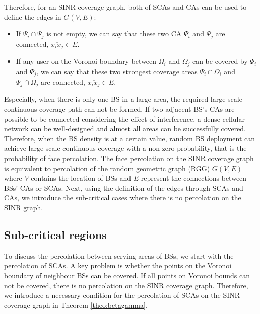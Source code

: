 \documentclass[final]{IEEEtran}
\begin{document}
Therefore, for an SINR coverage graph, both of SCAs and CAs can be used to define the edges in $G(V,E)$: 
\begin{itemize}
    \item If $\Psi_i\cap\Psi_j$ is not empty, we can say that these two CA $\Psi_i$ and $\Psi_j$ are connected, \ie $\overline{x_i x_j}\in E$. 
    \item If any user on the Voronoi boundary between $\Omega_i$ and $\Omega_j$ can be covered by $\Psi_i$ and $\Psi_j$, we can say that these two strongest coverage areas $\Psi_i\cap\Omega_i$ and $\Psi_j\cap\Omega_j$ are connected, \ie $\overline{x_i x_j}\in E$. 
\end{itemize}
Especially, when there is only one BS in a large area, the required large-scale continuous coverage path can not be formed. If two adjacent BS's CAs are possible to be connected considering the effect of interference, a dense cellular network can be well-designed and almost all areas can be successfully covered. Therefore, when the BS density is at a certain value, random BS deployment can achieve large-scale continuous coverage with a non-zero probability, that is the probability of face percolation. The face percolation on the SINR coverage graph is equivalent to percolation of the random geometric graph (RGG) $G(V,E)$ where $V$ contains the location of BSs and $E$ represent the connections between BSs' CAs or SCAs. Next, using the definition of the edges through SCAs and CAs, we introduce the sub-critical cases where there is no percolation on the SINR graph.

\subsection{Sub-critical regions}
To discuss the percolation between serving areas of BSs, we start with the percolation of SCAs. A key problem is whether the points on the Voronoi boundary of neighbour BSs can be covered. If all points on Voronoi bounds can not be covered, there is no percolation on the SINR coverage graph. Therefore,  we introduce a necessary condition for the percolation of SCAs on the SINR coverage graph in Theorem \ref{theo:betagamma}.
\end{document}

